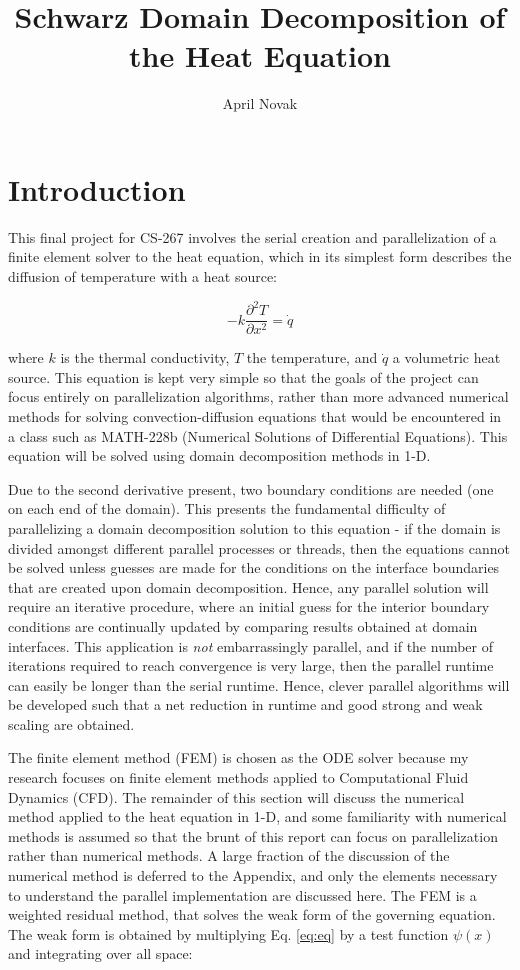 \documentclass[10pt]{article}
\title{Schwarz Domain Decomposition of the Heat Equation}
\author{April Novak}
\newcommand{\beq}{\begin{equation}}
\newcommand{\eeq}{\end{equation}}
\begin{document}
\maketitle

\section{Introduction}

This final project for CS-267 involves the serial creation and parallelization of a finite element solver to the heat equation, which in its simplest form describes the diffusion of temperature with a heat source:

\beq
\label{eq:eq}
-k\frac{\partial^2 T}{\partial x^2}=\dot{q}
\eeq

where \(k\) is the thermal conductivity, \(T\) the temperature, and \(\dot{q}\) a volumetric heat source. This equation is kept very simple so that the goals of the project can focus entirely on parallelization algorithms, rather than more advanced numerical methods for solving convection-diffusion equations that would be encountered in a class such as MATH-228b (Numerical Solutions of Differential Equations). This equation will be solved using domain decomposition methods in 1-D. 

Due to the second derivative present, two boundary conditions are needed (one on each end of the domain). This presents the fundamental difficulty of parallelizing a domain decomposition  solution to this equation - if the domain is divided amongst different parallel processes or threads, then the equations cannot be solved unless guesses are made for the conditions on the interface boundaries that are created upon domain decomposition. Hence, any parallel solution will require an iterative procedure, where an initial guess for the interior boundary conditions are continually updated by comparing results obtained at domain interfaces. This application is \textit{not} embarrassingly parallel, and if the number of iterations required to reach convergence is very large, then the parallel runtime can easily be longer than the serial runtime. Hence, clever parallel algorithms will be developed such that a net reduction in runtime and good strong and weak scaling are obtained.

The finite element method (FEM) is chosen as the ODE solver because my research focuses on finite element methods applied to Computational Fluid Dynamics (CFD). The remainder of this section will discuss the numerical method applied to the heat equation in 1-D, and some familiarity with numerical methods is assumed so that the brunt of this report can focus on parallelization rather than numerical methods. A large fraction of the discussion of the numerical method is deferred to the Appendix, and only the elements necessary to understand the parallel implementation are discussed here. The FEM is a weighted residual method, that solves the weak form of the governing equation. The weak form is obtained by multiplying Eq. \eqref{eq:eq} by a test function \(\psi(x)\) and integrating over all space:
\end{document}
